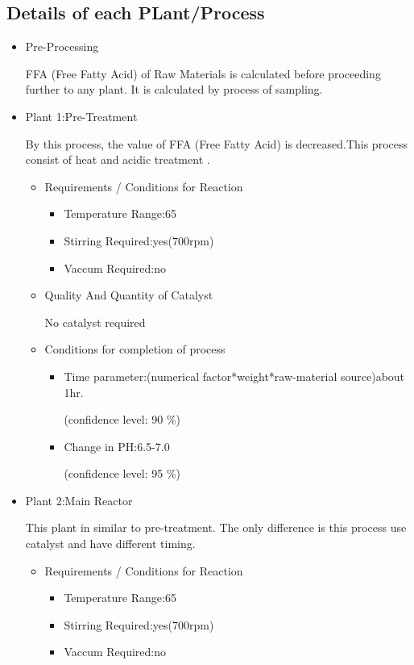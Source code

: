 \documentclass[12pt]{article}
\begin{document}
\subsection{Details of each PLant/Process}
\begin{itemize}
\item Pre-Processing \par
FFA (Free Fatty Acid) of Raw Materials is calculated before proceeding further to any plant. It is calculated by process of sampling.
\item Plant 1:Pre-Treatment\par
By this process, the value of FFA (Free Fatty Acid) is decreased.This process consist of heat and acidic treatment . 
\begin{itemize}
\item Requirements / Conditions for Reaction
\begin{itemize}
\item Temperature Range:65
\item Stirring Required:yes(700rpm)
\item Vaccum Required:no
\end{itemize}
\item Quality And Quantity of Catalyst\par
No catalyst required 
\item Conditions for completion of process\par
\begin{itemize}
\item Time parameter:(numerical factor*weight*raw-material source)about 1hr.\par
(confidence level: 90 \%) 
\item Change in PH:6.5-7.0\par
(confidence level: 95 \%)
\end{itemize}
\end{itemize}
\item Plant 2:Main Reactor\par
This plant in similar to pre-treatment. The only difference is this process use catalyst and have different timing.
\begin{itemize}
\item Requirements / Conditions for Reaction
\begin{itemize}
\item Temperature Range:65
\item Stirring Required:yes(700rpm)
\item Vaccum Required:no
\end{itemize}

\end{itemize}
\end{itemize}
\end{document}
